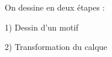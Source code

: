 \documentclass[preview]{standalone}
\begin{document}
\begin{center}
On dessine en deux étapes : 
        
1) Dessin d'un motif

2) Transformation du calque
\end{center}
\end{document}

